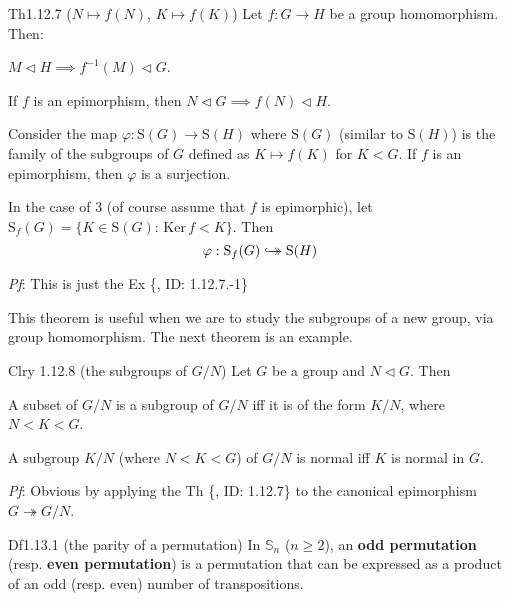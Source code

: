 \documentclass{article}
\newcommand{\nles}{\vartriangleleft}
\newcommand{\Ker}{\text{Ker}\,}
\newcommand{\hooktwoheadrightarrow}{%
        \hookrightarrow\mathrel{\mspace{-15mu}}\rightarrow}
\begin{document}
\begin{Th}{Th1.12.7 ($N\mapsto f(N)$, $K\mapsto f(K)$)}
    Let $f: G\to H$ be a group homomorphism. Then:
    \begin{compactenum}
        \item $M\nles H \implies f^{-1}(M) \nles G$.
        \item If $f$ is an epimorphism, then $N\nles G \implies f(N)\nles H$. 
        \item Consider the map $\varphi: \mathrm{S}(G)\to\mathrm{S}(H)$ where $\mathrm{S}(G)$ (similar to $\mathrm{S}(H)$) is the family of the subgroups of $G$ defined as $K\mapsto f(K)$ for $K<G$. If $f$ is an epimorphism, then $\varphi$ is a surjection.
        \item In the case of 3 (of course assume that $f$ is epimorphic), let $\mathrm{S}_f(G) = \{K\in\mathrm{S}(G): \,\Ker f<K\}$. Then 
        $$ \varphi: \mathrm{S}_f(G)\hooktwoheadrightarrow\mathrm{S}(H) $$
    \end{compactenum}
    \tcblower
    \textit{Pf}: This is just the Ex \{, ID: 1.12.7.-1\}
\end{Th}

\begin{Rmk}{}
    This theorem is useful when we are to study the subgroups of a new group, via group homomorphism. The next theorem is an example.
\end{Rmk}

\begin{Th}{Clry 1.12.8 (the subgroups of $G/N$)}
    Let $G$ be a group and $N\nles G$. Then
    \begin{compactenum}
        \item A subset of $G/N$ is a subgroup of $G/N$ iff it is of the form $K/N$, where $N<K<G$.
        \item A subgroup $K/N$ (where $N<K<G$) of $G/N$ is normal iff $K$ is normal in $G$.
    \end{compactenum}
    \tcblower
    \textit{Pf}: Obvious by applying the Th \{, ID: 1.12.7\} to the canonical epimorphism $G\twoheadrightarrow G/N$.
\end{Th}

\begin{Df}{Df1.13.1 (the parity of a permutation)}
    In $\mathbb{S}_n$ ($n\geq 2$), an \textbf{odd permutation} (resp. \textbf{even permutation}) is a permutation that can be expressed as a product of an odd (resp. even) number of transpositions. 
\end{Df}
\end{document}
